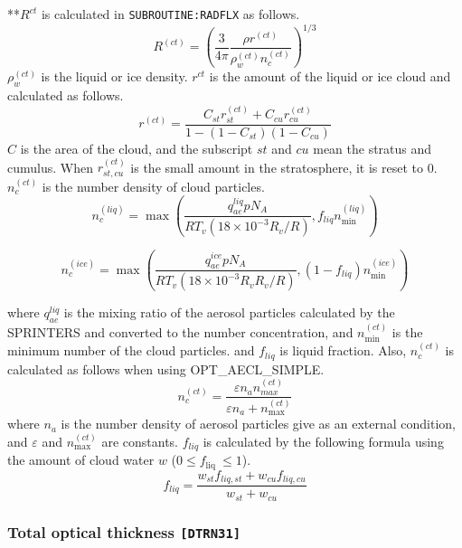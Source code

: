 **\(R^{ct}\) is calculated in \texttt{SUBROUTINE:RADFLX} as follows. \begin{equation}
R^{(c t)}=\left(\frac{3}{4 \pi} \frac{\rho r^{(c t)}}{\rho_{w}^{(c t)} n_{c}^{(c t)}}\right)^{1 / 3}
\end{equation} \(\rho_{w}^{(c t)}\) is the liquid or ice density. \(r^{ct}\) is the
amount of the liquid or ice cloud and calculated as follows. \begin{equation}
r^{(c t)}=\frac{C_{s t} r_{s t}^{(c t)}+C_{c u} r_{c u}^{(c t)}}{1-\left(1-C_{s t}\right)\left(1-C_{c u}\right)}
\end{equation} \(C\) is the area of the cloud, and the subscript \(st\) and \(cu\)
mean the stratus and cumulus. When \(r_{s t, c u}^{(c t)}\) is the small
amount in the stratosphere, it is reset to 0. \(n_{c}^{(c t)}\) is the
number density of cloud particles. \begin{equation}
n_{c}^{(l i q)}=\max \left(\frac{q_{a e}^{l i q} p N_{A}}{R T_{v}\left(18 \times 10^{-3} R_{v} / R\right)}, f_{l i q} n_{\min }^{(l i q)}\right)
\end{equation}

\begin{equation}
n_{c}^{(i c e)}=\max \left(\frac{q_{a e}^{i c e} p N_{A}}{R T_{v}\left(18 \times 10^{-3} R_{v} R_{v} / R\right)},\left(1-f_{l i q}\right) n_{\min }^{(i c e)}\right)
\end{equation}

where \(q_{a e}^{l i q}\) is the mixing ratio of the aerosol particles
calculated by the SPRINTERS and converted to the number concentration,
and \(n_{\min }^{(c t)}\) is the minimum number of the cloud particles.
and \(f_{liq}\) is liquid fraction. Also, \(n_{c}^{(c t)}\) is
calculated as follows when using OPT\_AECL\_SIMPLE. \begin{equation}
n_{c}^{(c t)}=\frac{\varepsilon n_{a} n_{m a x}^{(c t)}}{\varepsilon n_{a}+n_{\max }^{(c t)}}
\end{equation} where \(n_a\) is the number density of aerosol particles give as an
external condition, and \(\varepsilon\) and \(n_{\max }^{(c t)}\) are
constants. \(f_{liq}\) is calculated by the following formula using the
amount of cloud water \(w\) (\(0 \leq f_{\text {liq }} \leq 1\)). \begin{equation}
f_{l i q}=\frac{w_{s t} f_{l i q, s t}+w_{c u} f_{l i q, c u}}{w_{s t}+w_{c u}}
\end{equation}

\hypertarget{total-optical-thickness-dtrn31}{%
\subsubsection{\texorpdfstring{Total optical thickness
\texttt{{[}DTRN31{]}}}{Total optical thickness {[}DTRN31{]}}}\label{total-optical-thickness-dtrn31}}

